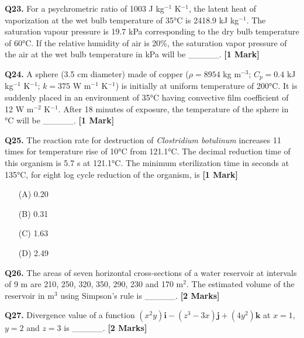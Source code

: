 \documentclass[11pt]{article}
\newcommand{\questiona}[2]{
    \noindent\textbf{Q#2.} #1 \hfill \textbf{[1 Mark]}
}
\newcommand{\questionb}[2]{
    \noindent\textbf{Q#2.} #1 \hfill \textbf{[2 Marks]}
}
\begin{document}
\vspace{0.5cm}

\questiona{For a psychrometric ratio of 1003 J kg$^{-1}$ K$^{-1}$, the latent heat of vaporization at the wet bulb temperature of 35°C is 2418.9 kJ kg$^{-1}$. The saturation vapour pressure is 19.7 kPa corresponding to the dry bulb temperature of 60°C. If the relative humidity of air is 20\%, the saturation vapor pressure of the air at the wet bulb temperature in kPa will be \_\_\_\_\_.}{23}

\vspace{0.5cm}

\questiona{A sphere (3.5 cm diameter) made of copper ($\rho = 8954$ kg m$^{-3}$; $C_p = 0.4$ kJ kg$^{-1}$ K$^{-1}$; $k = 375$ W m$^{-1}$ K$^{-1}$) is initially at uniform temperature of 200°C. It is suddenly placed in an environment of 35°C having convective film coefficient of 12 W m$^{-2}$ K$^{-1}$. After 18 minutes of exposure, the temperature of the sphere in °C will be \_\_\_\_\_.}{24}

\vspace{0.5cm}

\questiona{The reaction rate for destruction of \textit{Clostridium botulinum} increases 11 times for temperature rise of 10°C from 121.1°C. The decimal reduction time of this organism is 5.7 s at 121.1°C. The minimum sterilization time in seconds at 135°C, for eight log cycle reduction of the organism, is}{25}
\begin{enumerate}
    \item[(A)] 0.20
    \item[(B)] 0.31
    \item[(C)] 1.63
    \item[(D)] 2.49
\end{enumerate}

\vspace{0.5cm}

\questionb{The areas of seven horizontal cross-sections of a water reservoir at intervals of 9 m are 210, 250, 320, 350, 290, 230 and 170 m$^2$. The estimated volume of the reservoir in m$^3$ using Simpson's rule is \_\_\_\_\_.}{26}

\vspace{0.5cm}

\questionb{Divergence value of a function $(x^2y)\mathbf{i} - (z^3-3x)\mathbf{j} + (4y^2)\mathbf{k}$ at $x = 1$, $y = 2$ and $z = 3$ is \_\_\_\_\_.}{27}

\vspace{0.5cm}
\end{document}

